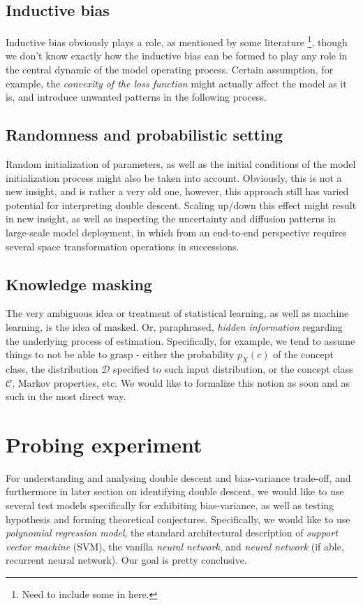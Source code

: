 \documentclass[10pt,oneside,oldfontcommands,dvipsnames,article]{memoir}
\begin{document}
\subsection{Inductive bias}
Inductive bias obviously plays a role, as mentioned by some literature \footnote{Need to include some in here.}, though we don't know exactly how the inductive bias can be formed to play any role in the central dynamic of the model operating process. Certain assumption, for example, the \textit{convexity of the loss function} might actually affect the model as it is, and introduce unwanted patterns in the following process. 
\subsection{Randomness and probabilistic setting}
Random initialization of parameters, as well as the initial conditions of the model initialization process might also be taken into account. Obviously, this is not a new insight, and is rather a very old one, however, this approach still has varied potential for interpreting double descent. Scaling up/down this effect might result in new insight, as well as inspecting the uncertainty and diffusion patterns in large-scale model deployment, in which from an end-to-end perspective requires several space transformation operations in successions.
\subsection{Knowledge masking}
The very ambiguous idea or treatment of statistical learning, as well as machine learning, is the idea of masked. Or, paraphrased, \textit{hidden information} regarding the underlying process of estimation. Specifically, for example, we tend to assume things to not be able to grasp - either the probability $p_{X}(c)$ of the concept class, the distribution $\mathcal{D}$ specified to such input distribution, or the concept class $\mathcal{C}$, Markov properties, etc. We would like to formalize this notion as soon and as such in the most direct way. 


\clearpage
\section{Probing experiment}

For understanding and analysing double descent and bias-variance trade-off, and furthermore in later section on identifying double descent, we would like to use several test models specifically for exhibiting bias-variance, as well as testing hypothesis and forming theoretical conjectures. Specifically, we would like to use \textit{polynomial regression model}, the standard architectural description of \textit{support vector machine} (SVM), the vanilla \textit{neural network}, and \textit{neural network} (if able, recurrent neural network). Our goal is pretty conclusive. 
\end{document}
